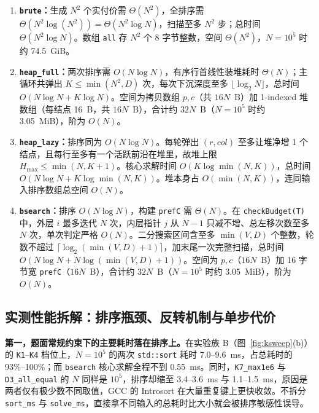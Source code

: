 \documentclass[12pt,a4paper,fontset=windows]{ctexart}
\theoremstyle{plain}
\newcommand{\code}[1]{\texttt{#1}}
\begin{document}
\begin{enumerate}[leftmargin=1.6em,itemsep=0.3em,topsep=0.18em]
  \item \textbf{\code{brute}：}生成 $N^2$ 个实付价需 $\Theta(N^2)$，全排序需 $\Theta(N^2\log(N^2)) = \Theta(N^2\log N)$，扫描至多 $N^2$ 步；总时间 $\Theta(N^2\log N)$。数组 \code{all} 存 $N^2$ 个 8 字节整数，空间 $\Theta(N^2)$，$N=10^5$ 时约 74.5~GiB。

  \item \textbf{\code{heap\_full}：}两次排序需 $O(N\log N)$，有序行首线性装堆耗时 $\Theta(N)$；主循环共弹出 $K \le \min(N^2, D)$ 次，每次下沉深度至多 $\lfloor \log_2 N \rfloor$，总时间 $O(N\log N + K\log N)$。空间为拷贝数组 $p, c$（共 $16N$~B）加 1-indexed 堆数组（每结点 16~B，共 $16N$~B），合计约 $32N$~B（$N=10^5$ 时约 3.05~MiB），阶为 $O(N)$。

  \item \textbf{\code{heap\_lazy}：}排序同为 $O(N\log N)$。每轮弹出 $(r, col)$ 至多让堆净增 1 个结点，且每行至多有一个活跃前沿在堆里，故堆上限 $H_{\max} \le \min(N, K+1)$。核心求解时间 $O(K\log\min(N, K))$，总时间 $O(N\log N + K\log\min(N, K))$。堆本身占 $O(\min(N, K))$，连同输入排序数组总空间 $O(N)$。

  \item \textbf{\code{bsearch}：}排序 $O(N\log N)$，构建 \code{prefC} 需 $\Theta(N)$。在 \code{checkBudget(T)} 中，外层 $i$ 最多迭代 $N$ 次，内层指针 $j$ 从 $N-1$ 只减不增、总左移次数至多 $N$ 次，单次判定严格 $O(N)$。二分搜索区间含至多 $\min(V, D)$ 个整数，轮数不超过 $\lceil \log_2(\min(V, D)+1) \rceil$，加末尾一次完整扫描，总时间 $O(N\log N + N\log(\min(V, D)+1))$。空间为 $p, c$（$16N$~B）加 16 字节宽 \code{prefC}（$16N$~B），合计约 $32N$~B（$N=10^5$ 时约 3.05~MiB），阶为 $O(N)$。
\end{enumerate}

\subsection{实测性能拆解：排序瓶颈、反转机制与单步代价}

\textbf{第一，题面常规约束下的主要耗时落在排序上。}在实验族 B（图~\ref{fig:ksweep}(b)）的 \code{K1}--\code{K4} 档位上，$N=10^5$ 的两次 \code{std::sort} 耗时 7.0--9.6~ms，占总耗时的 93\%--100\%；而 \code{bsearch} 核心求解全程不到 0.55~ms。同时，\code{K7\_max1e6} 与 \code{D3\_all\_equal} 的 $N$ 同样是 $10^5$，排序却缩至 3.4--3.6~ms 与 1.1--1.5~ms，原因是两者仅有极少数不同取值，GCC 的 Introsort 在大量重复键上更快收敛。不拆分 \code{sort\_ms} 与 \code{solve\_ms}，直接拿不同输入的总耗时比大小就会被排序敏感性误导。
\end{document}
